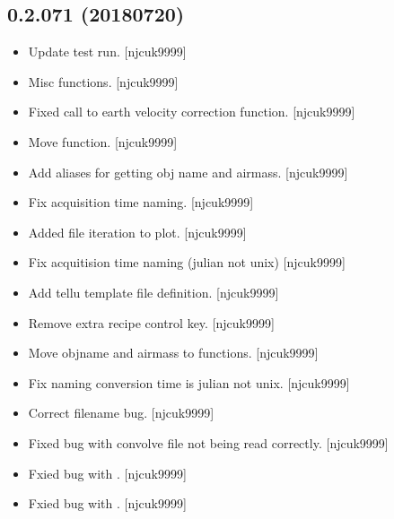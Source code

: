 \documentclass[a4paper,10pt,english]{report}
\begin{document}
\subsection{0.2.071 (2018\sphinxhyphen{}07\sphinxhyphen{}20)}
\label{\detokenize{misc/changelog:id406}}\begin{itemize}
\item {} 
Update test run. {[}njcuk9999{]}

\item {} 
Misc functions. {[}njcuk9999{]}

\item {} 
Fixed call to earth velocity correction function. {[}njcuk9999{]}

\item {} 
Move  function. {[}njcuk9999{]}

\item {} 
Add aliases for getting obj name and airmass. {[}njcuk9999{]}

\item {} 
Fix acquisition time naming. {[}njcuk9999{]}

\item {} 
Added file iteration to plot. {[}njcuk9999{]}

\item {} 
Fix acquitision time naming (julian not unix) {[}njcuk9999{]}

\item {} 
Add tellu template file definition. {[}njcuk9999{]}

\item {} 
Remove extra recipe control key. {[}njcuk9999{]}

\item {} 
Move objname and airmass to functions. {[}njcuk9999{]}

\item {} 
Fix naming conversion time is julian not unix. {[}njcuk9999{]}

\item {} 
Correct filename bug. {[}njcuk9999{]}

\item {} 
Fixed bug with convolve file not being read correctly. {[}njcuk9999{]}

\item {} 
Fxied bug with . {[}njcuk9999{]}

\item {} 
Fxied bug with . {[}njcuk9999{]}


\end{itemize}
\end{document}
